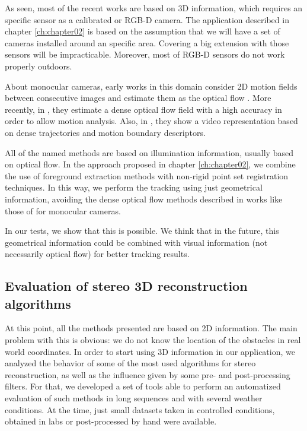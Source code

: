 As seen, most of the recent works are based on 3D information, which requires an specific sensor as a calibrated or RGB-D camera. The application described in chapter \ref{ch:chapter02} is based on the assumption that we will have a set of cameras installed around an specific area. Covering a big extension with those sensors will be impracticable. Moreover, most of RGB-D sensors do not work properly outdoors.

About monocular cameras, early works in this domain consider 2D motion fields between consecutive images and estimate them as the optical flow \citep{birchfield1997derivation}. More recently, in \cite{brox2011large}, they estimate a dense optical flow field with a high accuracy in order to allow motion analysis. Also, in \cite{wang2013dense}, they show a video representation based on dense trajectories and motion boundary descriptors.

All of the named methods are based on illumination information, usually based on optical flow. In the approach proposed in chapter \ref{ch:chapter02}, we combine the use of foreground extraction methods with non-rigid point set registration techniques. In this way, we perform the tracking using just geometrical information, avoiding the dense optical flow methods described in works like those of \cite{brox2011large, wang2013dense} for monocular cameras. 

In our tests, we show that this is possible. We think that in the future, this geometrical information could be combined with visual information (not necessarily optical flow) for better tracking results.

\subsection{Evaluation of stereo 3D reconstruction algorithms}\label{ch:chapter00_02_03}

At this point, all the methods presented are based on 2D information. The main problem with this is obvious: we do not know the location of the obstacles in real world coordinates. In order to start using 3D information in our application, we analyzed the behavior of some of the most used algorithms for stereo reconstruction, as well as the influence given by some pre- and post-processing filters. For that, we developed a set of tools able to perform an automatized evaluation of such methods in long sequences and with several weather conditions. At the time, just small datasets taken in controlled conditions, obtained in labs or post-processed by hand were available.

